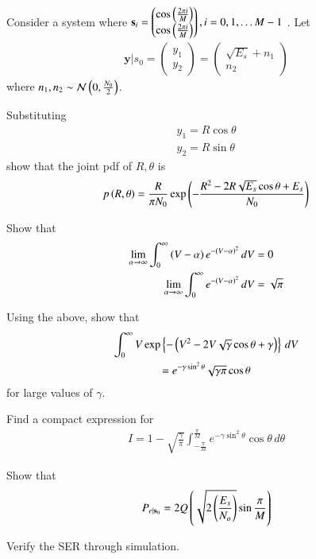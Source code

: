 \documentclass[journal,12pt,twocolumn]{IEEEtran}
\begin{document}
Consider a system where 
$\mathbf{s}_i=
\begin{pmatrix}
\cos\left(\frac{2\pi i}{M}\right)\\
\cos\left(\frac{2\pi i}{M}\right)
\end{pmatrix}, i = 0, 1 , \dots M-1
$
.
Let
%
\begin{align}
\mathbf{y}|s_0 = 
\begin{pmatrix}
y_1\\
y_2
\end{pmatrix}
=
\begin{pmatrix}
\sqrt{E_s}+n_1\\
n_2
\end{pmatrix}
\end{align}
where $n_1,n_2 \sim \mathcal{N}\left(0,\frac{N_0}{2}\right)$.
\begin{problem}
 Substituting 
\begin{align}
y_1=R\cos \theta \\
y_2=R\sin \theta
\end{align}
show that the joint pdf of $R,\theta$ is
%
\begin{equation}
p\left(R,\theta\right)=\frac{R}{\pi N_0}\exp\left(-\frac{R^2-2R\sqrt{E_s}\cos \theta + E_s}{N_0}\right)
\end{equation}
\end{problem}
\begin{problem}
Show that 
%
\begin{align}
\lim_{\alpha \rightarrow \infty}\int_{0}^{\infty}\left(V-\alpha \right)e^{-\left(V-\alpha\right)^2 }\,dV
&= 0
\\
\lim_{\alpha \rightarrow \infty}\int_{0}^{\infty} e^{-\left(V-\alpha\right)^2 }\,dV
&=  \sqrt{\pi}
\end{align}
\end{problem}
\begin{problem}
Using the above, show that
%
\begin{multline}
\int_{0}^{\infty}V\exp\left\{-\left(V^2 - 2V \sqrt{\gamma}\cos \theta +\gamma\right)\right\}\,dV
\\
= e^{-\gamma\sin^2 \theta} \sqrt{\gamma\pi}\cos \theta
\end{multline}
%
for large values of $\gamma$.
\end{problem}
\begin{problem}
Find a compact expression for
%
\begin{align}
I = 1 - \sqrt{\frac{\gamma}{\pi}}\int_{-\frac{\pi}{M}}^{\frac{\pi}{M}}e^{- \gamma\sin^2\theta }\cos \theta\, d\theta
\end{align}
\end{problem}
\begin{problem}
Show that
\begin{equation}
P_{e|\mathbf{s}_0}=2Q\left(\sqrt{2\left(\frac{{E_s}}{N_o}\right)}\sin \frac{\pi}{M}\right)
\end{equation}
\end{problem}
\begin{problem}
Verify the SER through simulation.
\end{problem}

%
\end{document}
